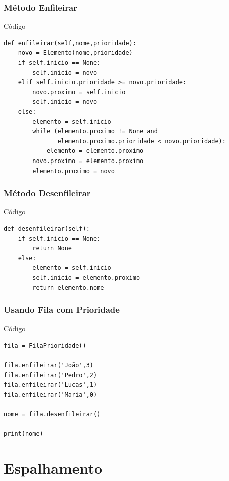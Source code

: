 \documentclass{beamer}
\begin{document}
\begin{frame}[fragile]
\frametitle{Método Enfileirar}

\begin{exampleblock}{Código}
\begin{lstlisting}
def enfileirar(self,nome,prioridade):
    novo = Elemento(nome,prioridade)
    if self.inicio == None:
        self.inicio = novo
    elif self.inicio.prioridade >= novo.prioridade:
        novo.proximo = self.inicio
        self.inicio = novo
    else:
        elemento = self.inicio
        while (elemento.proximo != None and 
               elemento.proximo.prioridade < novo.prioridade):
            elemento = elemento.proximo
        novo.proximo = elemento.proximo
        elemento.proximo = novo
\end{lstlisting}
\end{exampleblock}
\end{frame}

\begin{frame}[fragile]
\frametitle{Método Desenfileirar}

\begin{exampleblock}{Código}
\begin{lstlisting}
def desenfileirar(self):
    if self.inicio == None:
        return None
    else:
        elemento = self.inicio
        self.inicio = elemento.proximo
        return elemento.nome
\end{lstlisting}
\end{exampleblock}
\end{frame}

\begin{frame}[fragile]
\frametitle{Usando Fila com Prioridade}

\begin{exampleblock}{Código}
\begin{lstlisting}
fila = FilaPrioridade()

fila.enfileirar('João',3)
fila.enfileirar('Pedro',2)
fila.enfileirar('Lucas',1)
fila.enfileirar('Maria',0)

nome = fila.desenfileirar()

print(nome)
\end{lstlisting}
\end{exampleblock}
\end{frame}

\section{Espalhamento}
\end{document}
